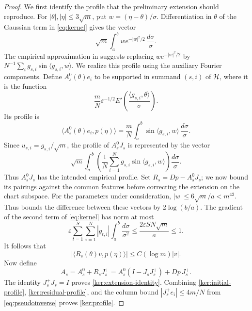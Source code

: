\begin{proof}
We first identify the profile that the preliminary extension should
reproduce. For $|\theta|,|\eta|\le3\sqrt m$, put
$w=(\eta-\theta)/\sigma$. Differentiation in $\theta$ of the Gaussian
term in \eqref{eq:kernel} gives the vector
\[
 \sqrt m\int_a^b w e^{-|w|^2/2}\,\frac{d\sigma}{\sigma}.
\]
The empirical approximation in  suggests replacing
$w e^{-|w|^2/2}$ by $N^{-1}\sum_i g_{s,i}\sin\langle g_{s,i},w\rangle$.
We realize this profile using the auxiliary Fourier components.
Define $A_s^0(\theta)e_i$ to be supported in summand $(s,i)$ of $\mathcal H$,
where it is the function
\[
 \frac{m}{N}\varepsilon^{-1/2}
 E'\!\left(\frac{\langle g_{s,i},\theta\rangle}{\sigma}\right).
\]
Its profile is
\begin{equation}
\label{ker:initial-profile}
 \langle A_s^0(\theta)e_i,p(\eta)\rangle
 =\frac{m}{N}\int_a^b\sin\langle g_{s,i},w\rangle\,
          \frac{d\sigma}{\sigma}.
\end{equation}
Since $u_{s,i}=g_{s,i}/\sqrt m$, the profile of
$A_s^0J_s$ is represented by the vector
\[
 \sqrt m\int_a^b
 \left(\frac1N\sum_{i=1}^N g_{s,i}\sin\langle g_{s,i},w\rangle\right)
 \frac{d\sigma}{\sigma}.
\]
Thus $A_s^0J_s$ has the intended empirical profile. Set
$R_s=Dp-A_s^0J_s$; we now bound its pairings against the common features
before correcting the extension on the chart subspace.
For the parameters under consideration,
$|w|\le6\sqrt m/a<m^{42}$.  Thus  bounds the
difference between these vectors by $2\log(b/a)$.
The gradient of the second term of \eqref{eq:kernel} has norm at most
\[
 \varepsilon\sum_{t=1}^{S}\sum_{i=1}^{N}|g_{t,i}|
        \int_a^b\frac{d\sigma}{\sigma^2}
 \le\frac{2\varepsilon SN\sqrt m}{a}\le1.
\]
It follows that
\begin{equation}
\label{ker:residual-profile}
 \bigl|\langle R_s(\theta)v,p(\eta)\rangle\bigr|
 \le C(\log m)|v|.
\end{equation}
Now define
\begin{equation}
\label{ker:A-definition}
 A_s=A_s^0+R_sJ_s^+=A_s^0(I-J_sJ_s^+)+Dp\,J_s^+.
\end{equation}
The identity $J_s^+J_s=I$ proves \eqref{ker:extension-identity}.
Combining \eqref{ker:initial-profile}, \eqref{ker:residual-profile}, and
the column bound $|J_s^+e_i|\le4m/N$ from \eqref{eq:pseudoinverse}
proves \eqref{ker:profile}.


\end{proof}
